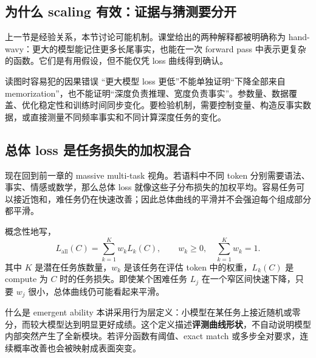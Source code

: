 \subsection{为什么 scaling 有效：证据与猜测要分开}

上一节是经验关系，本节讨论可能机制。课堂给出的两种解释都被明确称为 hand-wavy：更大的模型能记住更多长尾事实，也能在一次 forward pass 中表示更复杂的函数。它们是有用假设，但不能仅凭 loss 曲线得到确认。


\begin{warningbox}{读图时容易犯的因果错误}
“更大模型 loss 更低”不能单独证明“下降全部来自 memorization”，也不能证明“深度负责推理、宽度负责事实”。参数量、数据覆盖、优化稳定性和训练时间同步变化。要检验机制，需要控制变量、构造反事实数据，或直接测量不同频率事实和不同计算深度任务的变化。
\end{warningbox}


\subsection{总体 loss 是任务损失的加权混合}

现在回到前一章的 massive multi-task 视角。若语料中不同 token 分别需要语法、事实、情感或数学，那么总体 loss 就像这些子分布损失的加权平均。容易任务可以接近饱和，难任务仍在快速改善；因此总体曲线的平滑并不会强迫每个组成部分都平滑。



概念性地写，
\[
L_{\mathrm{all}}(C)=\sum_{k=1}^{K} w_k L_k(C),
\qquad w_k\ge 0,\quad \sum_{k=1}^{K}w_k=1.
\]
其中 $K$ 是潜在任务族数量，$w_k$ 是该任务在评估 token 中的权重，$L_k(C)$ 是 compute 为 $C$ 时的任务损失。即使某个困难任务 $L_j$ 在一个窄区间快速下降，只要 $w_j$ 很小，总体曲线仍可能看起来平滑。

\begin{knowledgebox}{什么是 emergent ability}
本讲采用行为层定义：小模型在某任务上接近随机或零分，而较大模型达到明显更好成绩。这个定义描述\textbf{评测曲线形状}，不自动说明模型内部突然产生了全新模块。若评分函数有阈值、exact match 或多步全对要求，连续概率改善也会被映射成表面突变。
\end{knowledgebox}

